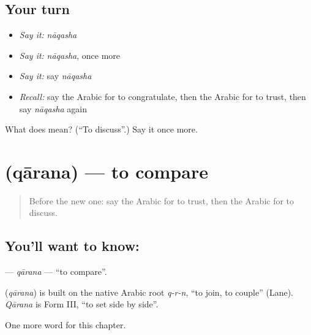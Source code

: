 \subsection*{Your turn}
\begin{itemize}
\raggedright
  \item \emph{Say it:} \emph{nāqasha}
  \item \emph{Say it:} \emph{nāqasha}, once more
  \item \emph{Say it:} say \emph{nāqasha}
  \item \emph{Recall:} say the Arabic for to congratulate, then the Arabic for to trust, then say \emph{nāqasha} again
\end{itemize}

\begin{tcolorbox}[breakable,colback=teal!4,colframe=teal!35!black,title={Before you move on}]
What does  mean? (\textquotedblleft{}To discuss\textquotedblright{}.) Say it once more.
\end{tcolorbox}
\section[\texorpdfstring{\ar{قارن} (qārana)}{قارن (qārana)}]{ (qārana) — to compare}

\label{lesson:AR-C197-qarana}



\begin{quote}
Before the new one: say the Arabic for to trust, then the Arabic for to discuss.
\end{quote}

\subsection*{You'll want to know: }
\textbf{} — \emph{qārana} — \textquotedblleft{}to compare\textquotedblright{}.

\begin{cousinweb}
\textbf{} (\emph{qārana}) is built on the native Arabic root \emph{q-r-n}, \textquotedblleft{}to join, to couple\textquotedblright{} (Lane). \emph{Qārana} is Form III, \textquotedblleft{}to set side by side\textquotedblright{}.
\end{cousinweb}

\begin{grammarlens}[title={What you've built}]
One more word for this chapter.
\end{grammarlens}

